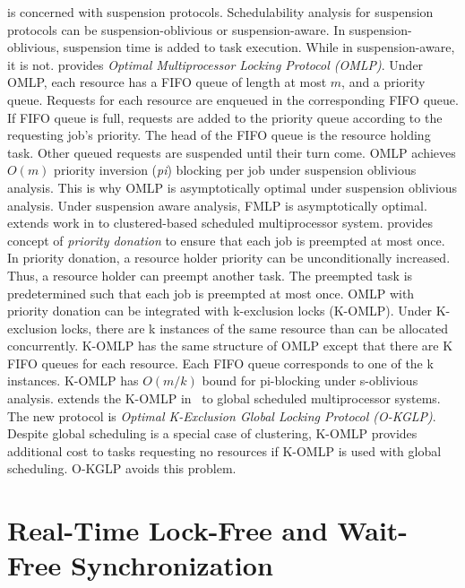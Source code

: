 \documentclass[12pt,english]{report}
\begin{document}
\cite{key-3} is concerned with suspension protocols. Schedulability
analysis for suspension protocols can be suspension-oblivious or suspension-aware.
In suspension-oblivious, suspension time is added to task execution.
While in suspension-aware, it is not. \cite{key-3} provides \textit{Optimal
Multiprocessor Locking Protocol (OMLP)}. Under OMLP, each resource
has a FIFO queue of length at most $m$, and a priority queue. Requests
for each resource are enqueued in the corresponding FIFO queue. If
FIFO queue is full, requests are added to the priority queue according
to the requesting job's priority. The head of the FIFO queue is the
resource holding task. Other queued requests are suspended until their
turn come. OMLP achieves $O(m)$ priority inversion (\textit{pi})
blocking per job under suspension oblivious analysis. This is why
OMLP is asymptotically optimal under suspension oblivious analysis.
Under suspension aware analysis, FMLP is asymptotically optimal. \cite{6064513}
extends work in \cite{key-3} to clustered-based scheduled multiprocessor
system. \cite{6064513} provides concept of \textit{priority donation}
to ensure that each job is preempted at most once. In priority donation,
a resource holder priority can be unconditionally increased. Thus,
a resource holder can preempt another task. The preempted task is
predetermined such that each job is preempted at most once. OMLP with
priority donation can be integrated with k-exclusion locks (K-OMLP).
Under K-exclusion locks, there are k instances of the same resource
than can be allocated concurrently. K-OMLP has the same structure
of OMLP except that there are K FIFO queues for each resource. Each
FIFO queue corresponds to one of the k instances. K-OMLP has $O(m/k)$
bound for pi-blocking under s-oblivious analysis. \cite{elliott2011optimal}
extends the K-OMLP in~\cite{6064513} to global
scheduled multiprocessor systems. The new protocol is \textit{Optimal
K-Exclusion Global Locking Protocol (O-KGLP)}. Despite global scheduling
is a special case of clustering, K-OMLP provides additional cost
to tasks requesting no resources if K-OMLP is used with global scheduling.
O-KGLP avoids this problem.

\section{\label{sec:lock-free and wait-free}Real-Time Lock-Free and Wait-Free Synchronization}
\end{document}
